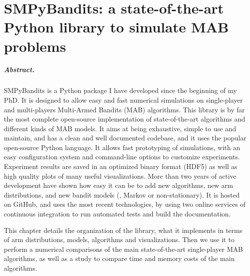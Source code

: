
\chapter{SMPyBandits: a state-of-the-art Python library to simulate MAB problems}
\label{chapter:3}
\minitoc

\newpage
\paragraph{Abstract.}
%
SMPyBandits is a Python package I have developed since the beginning of my PhD.
It is designed to allow easy and fast numerical simulations on single-player and multi-players Multi-Armed Bandits (MAB) algorithms.
This library is by far the most complete open-source implementation of state-of-the-art algorithms and different kinds of MAB models.
It aims at being exhaustive, simple to use and maintain, and has a clean and well documented codebase, and it uses the popular open-source Python language.
It allows fast prototyping of simulations, with an easy configuration system and command-line options to customize experiments.
Experiment results are saved in an optimized binary format (HDF5) as well as high quality plots of many useful visualizations.
%
More than two years of active development have shown how easy it can be to add new algorithms, new arm distributions, and new bandit models (\eg, Markov or non-stationary).
It is hosted on GitHub, and uses the most recent technologies, by using two online services of continuous integration to run automated tests and build the documentation.

This chapter details the organization of the library, what it implements in terms of arm distributions, models, algorithms and visualizations.
Then we use it to perform a numerical comparisons of the main state-of-the-art single-player MAB algorithms, as well as a study to compare time and memory costs of the main algorithms.

\graphicspath{{2-Chapters/3-Chapter/Images/}}
\graphicspath{{2-Chapters/3-Chapter/SMPyBandits_paper.git/plots/}}


